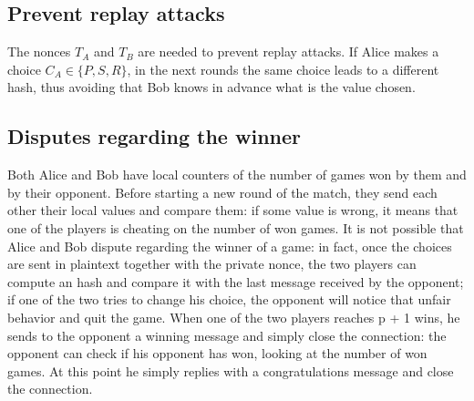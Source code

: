 \documentclass[11 pt]{article}
\begin{document}
\subsection{Prevent replay attacks}
The nonces $T_A$ and $T_B$ are needed to prevent replay attacks. If Alice makes a choice $C_A \in \{P, S, R\}$, in the next rounds the same choice leads to a different hash, thus avoiding that Bob knows in advance what is the value chosen.

\subsection{Disputes regarding the winner}
Both Alice and Bob have local counters of the number of games won by them and by their opponent. Before starting a new round of the match, they send each other their local values and compare them: if some value is wrong, it means that one of the players is cheating on the number of won games. It is not possible that Alice and Bob dispute regarding the winner of a game: in fact, once the choices are sent in plaintext together with the private nonce, the two players can compute an hash and compare it with the last message received by the opponent; if one of the two tries to change his choice, the opponent will notice that unfair behavior and quit the game. When one of the two players reaches p + 1 wins, he sends to the opponent a winning message and simply close the connection: the opponent can check if his opponent has won, looking at the number of won games. At this point he simply replies with a congratulations message and close the connection.
\end{document}
